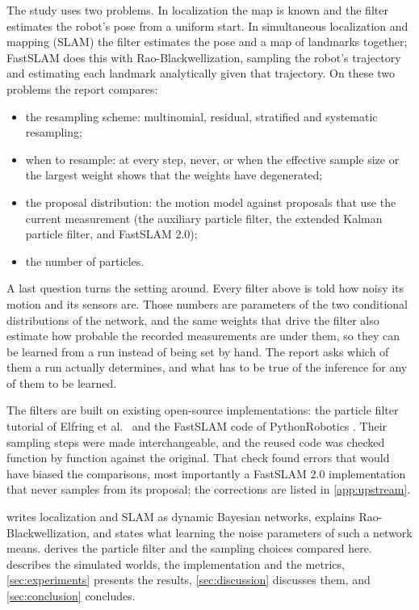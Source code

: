 The study uses two problems. In localization the map is known and the filter estimates the robot's pose from a
uniform start. In simultaneous localization and mapping (SLAM) the filter estimates the pose and a map of
landmarks together; FastSLAM \cite{montemerlo2002fastslam} does this with Rao-Blackwellization, sampling the
robot's trajectory and estimating each landmark analytically given that trajectory. On these two problems the
report compares:
\begin{itemize}
  \item the resampling scheme: multinomial, residual, stratified and systematic resampling;
  \item when to resample: at every step, never, or when the effective sample size or the largest weight shows
        that the weights have degenerated;
  \item the proposal distribution: the motion model against proposals that use the current measurement (the
        auxiliary particle filter, the extended Kalman particle filter, and FastSLAM 2.0);
  \item the number of particles.
\end{itemize}
A last question turns the setting around. Every filter above is told how noisy its motion and its sensors are.
Those numbers are parameters of the two conditional distributions of the network, and the same weights that drive
the filter also estimate how probable the recorded measurements are under them, so they can be learned from a run
instead of being set by hand. The report asks which of them a run actually determines, and what has to be true of
the inference for any of them to be learned.

The filters are built on existing open-source implementations: the particle filter tutorial of Elfring et al.\
\cite{elfring2021particle} and the FastSLAM code of PythonRobotics \cite{sakai2018pythonrobotics}. Their sampling
steps were made interchangeable, and the reused code was checked function by function against the original. That check found errors that would have biased the comparisons, most importantly a FastSLAM
2.0 implementation that never samples from its proposal; the corrections are listed in \cref{app:upstream}.

 writes localization and SLAM as dynamic Bayesian networks, explains Rao-Blackwellization, and
states what learning the noise parameters of such a network means.
\Cref{sec:particle-filters} derives the particle filter and the sampling choices compared here.
\Cref{sec:method} describes the simulated worlds, the implementation and the metrics, \cref{sec:experiments}
presents the results, \cref{sec:discussion} discusses them, and \cref{sec:conclusion} concludes.
